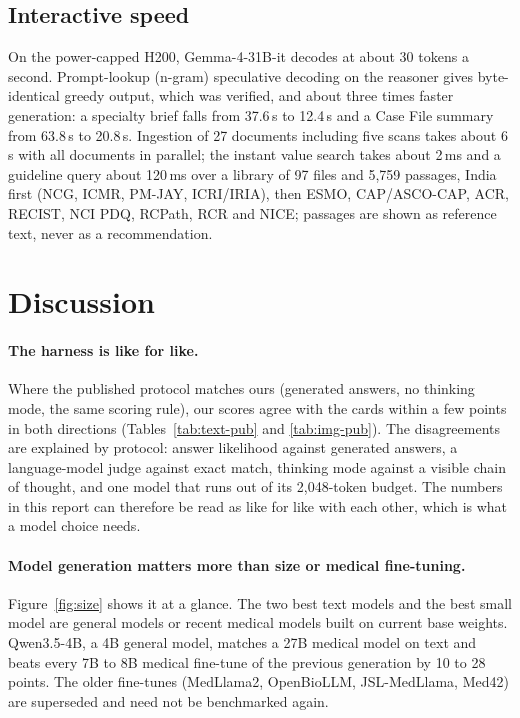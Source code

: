 \documentclass{article}
\newcommand{\fit}[1]{\adjustbox{max width=\textwidth}{#1}}
\begin{document}
\begin{table}[htbp]
\centering\small
\caption{The OCR number check with Tesseract: false alarms with the reference text as the transcription (111 pages) and planted one-digit errors caught (839 substitutions, 839 insertions, 735 deletions).}
\label{tab:ocr-check}
\fit{}
\end{table}

\subsection{Interactive speed}
\label{sec:speed}

On the power-capped H200, Gemma-4-31B-it decodes at about 30 tokens a second. Prompt-lookup (n-gram) speculative decoding on the reasoner gives byte-identical greedy output, which was verified, and about three times faster generation: a specialty brief falls from 37.6\,s to 12.4\,s and a Case File summary from 63.8\,s to 20.8\,s. Ingestion of 27 documents including five scans takes about 6\,s with all documents in parallel; the instant value search takes about 2\,ms and a guideline query about 120\,ms over a library of 97 files and 5,759 passages, India first (NCG, ICMR, PM-JAY, ICRI/IRIA), then ESMO, CAP/ASCO-CAP, ACR, RECIST, NCI PDQ, RCPath, RCR and NICE; passages are shown as reference text, never as a recommendation.

\section{Discussion}

\paragraph{The harness is like for like.} Where the published protocol matches ours (generated answers, no thinking mode, the same scoring rule), our scores agree with the cards within a few points in both directions (Tables~\ref{tab:text-pub} and \ref{tab:img-pub}). The disagreements are explained by protocol: answer likelihood against generated answers, a language-model judge against exact match, thinking mode against a visible chain of thought, and one model that runs out of its 2,048-token budget. The numbers in this report can therefore be read as like for like with each other, which is what a model choice needs.

\paragraph{Model generation matters more than size or medical fine-tuning.} Figure~\ref{fig:size} shows it at a glance. The two best text models and the best small model are general models or recent medical models built on current base weights. Qwen3.5-4B, a 4B general model, matches a 27B medical model on text and beats every 7B to 8B medical fine-tune of the previous generation by 10 to 28 points. The older fine-tunes (MedLlama2, OpenBioLLM, JSL-MedLlama, Med42) are superseded and need not be benchmarked again.
\end{document}
